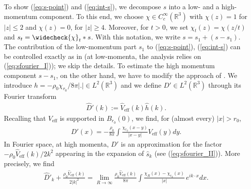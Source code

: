 \documentclass[a4paper,11pt]{article}
\def\bR{\mathbb{R}}
\numberwithin{equation}{section}
\begin{document}
To show (\ref{eq:s-point}) and (\ref{eq:int-s}), we decompose $s$ into a low- and a high-momentum component. To this end, we choose $\chi \in C_c^\infty (\bR^3)$ with $\chi (z) = 1$ for $|z| \leq 2$ and $\chi (z) = 0$, for $|z| \geq 4$. Moreover, for $t > 0$, we set $\chi_t (z) = \chi (z/t)$ and $s_t = \widecheck{\chi}_t * s$. With this notation, we write $s = s_1 + (s-s_1)$. The contribution of the low-momentum part $s_1$ to (\ref{eq:s-point}), (\ref{eq:int-s}) can be controlled exactly as in \cite[Lemma 2.2]{BBCOS} (at low-momenta, the analysis relies on (\ref{eq:sfourier_I})); we skip the details. To estimate the high momentum component $s-s_1$, on the other hand, we have to modify the approach of \cite{BBCOS}. We introduce $h = - \rho_0 \chi_{r_0} / 8\pi |.| \in L^2 (\bR^3)$ and we define $D' \in L^2 (\bR^3)$ through its Fourier transform 
\begin{align*}
    \widehat{D}'(k):=\widehat{V}_\mathrm{eff}(k)\widehat{h}(k).
\end{align*}
Recalling that $V_\mathrm{eff}$ is supported in $B_{r_0}(0)$, 
we find, for (almost every) $|x|>r_0$, 
\begin{align}
\label{Eq:explicit_formula_D(x)}
    D'(x) = -\frac{\rho_0}{8\pi}\int  \frac{\chi_{r_0}(x-y)}{|x-y|}V_\mathrm{eff}(y)dy.
\end{align}
In Fourier space, at high momenta, $D'$ is an approximation for the factor $- \rho_0 \widehat{V}_\text{eff} (k) / 2k^2$ appearing in the expansion of $\widehat{s}_k$ (see (\ref{eq:sfourier_II})). More precisely, we find 
\begin{align*}
    \widehat{D}'_k +\frac{\rho_0 \widehat{V}_\mathrm{eff}(k)}{2|k|^2}=\lim_{R\rightarrow \infty} \frac{\rho_0 \widehat{V}_\mathrm{eff}(k)}{8\pi}\int \frac{\chi_R(x)-\chi_{r_0}(x)}{|x|} \, e^{i k \cdot x}dx.
\end{align*}
\end{document}
